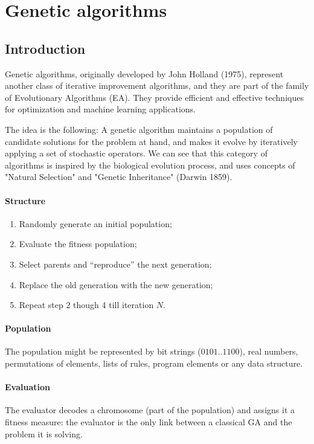 \section{Genetic algorithms}
\subsection{Introduction}
Genetic algorithms, originally developed by John Holland (1975), represent another class of iterative improvement algorithms, and they are part of the family of Evolutionary Algorithms (EA). They provide efficient and effective techniques for optimization and machine learning applications.


The idea is the following: A genetic algorithm maintains a population of candidate solutions for the problem at hand, and makes it evolve by iteratively applying a set of stochastic operators. We can see that this category of algorithms is inspired by the biological evolution process, and uses concepts of "Natural Selection" and "Genetic Inheritance" (Darwin 1859).

\paragraph{Structure}

\begin{enumerate}
    \item Randomly generate an initial population;
    \item Evaluate the fitness population;
    \item Select parents and “reproduce” the next generation;
    \item Replace the old generation with the new generation;
    \item Repeat step 2 though 4 till iteration $N$.
\end{enumerate}

\paragraph{Population} The population might be represented by bit strings ($0101..1100$), real numbers, permutations of elements, lists of rules, program elements or any data structure.

\paragraph{Evaluation}
The evaluator decodes a chromosome (part of the population) and assigns it a fitness measure: the evaluator is the only link between a classical GA and the problem it is solving.

